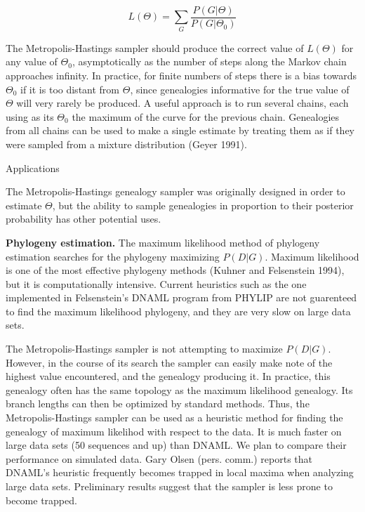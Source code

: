 \begin{equation}
L(\Theta)=\sum_G \frac{P(G|\Theta)}{P(G|\Theta_0)}
\end{equation}

The Metropolis-Hastings sampler should produce the correct value of
$L(\Theta)$
for any value of $\Theta_0$, asymptotically as the number of
steps along the Markov chain approaches infinity.  In practice, for
finite numbers of steps there is a bias towards $\Theta_0$ if it is too
distant from $\Theta$, since genealogies informative for the true value
of $\Theta$ will very rarely be produced.  A
useful approach is to run several chains, each using
as its $\Theta_0$ the maximum of the curve for the previous chain.
Genealogies from all chains can be used to make a single estimate by treating
them as if they were sampled from a mixture distribution (Geyer 1991).

\bigskip
{\center Applications}

The Metropolis-Hastings genealogy sampler was originally designed in order to
estimate $\Theta$, but the ability to sample genealogies in proportion
to their posterior probability has other potential uses.

{\bf Phylogeny estimation.}  The maximum likelihood method of phylogeny 
estimation searches for the phylogeny maximizing $P(D|G)$.
Maximum likelihood
is one of the most effective phylogeny methods (Kuhner
and Felsenstein 1994), but it is computationally intensive.
Current heuristics such as the one implemented in Felsenstein's DNAML
program from PHYLIP are not guarenteed to find the maximum likelihood
phylogeny, and they are very slow on large data sets.

The Metropolis-Hastings sampler is not attempting to maximize $P(D|G)$.
However, in the course of its search
the sampler can easily make note of the highest value encountered, and
the genealogy producing it.
In practice, this genealogy often has the same topology as
the maximum likelihood genealogy.  Its branch lengths can then be 
optimized by standard methods.  Thus, the Metropolis-Hastings sampler
can be used as a heuristic method for finding the genealogy of maximum
likelihod with respect to the data.  It is much faster on large data
sets (50 sequences and up) than DNAML. 
We plan to compare their performance on simulated data.
Gary Olsen (pers. comm.) reports
that DNAML's heuristic frequently becomes trapped in local maxima when
analyzing large data sets.  Preliminary results suggest that the
sampler is less prone to become trapped.

